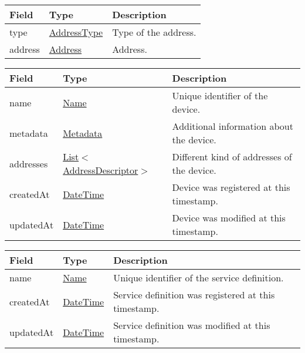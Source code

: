 \documentclass[a4paper]{arrowhead}
\newcommand{\pref}[1]{{\textcolor{ArrowheadGrey}{\hyperref[sec:model:primitives:#1]{#1}}}}
\begin{document}

\begin{table}[ht!]
\begin{tabularx}{\textwidth}{| p{2.5cm} | p{2.5cm} | X |} \hline
\rowcolor{gray!33} Field & Type      & Description \\ \hline
type & \pref{AddressType} & Type of the address. \\ \hline
address & \pref{Address} & Address. \\ \hline
\end{tabularx}
\end{table}

\clearpage

 
\begin{table}[ht!]
\begin{tabularx}{\textwidth}{| p{2.5cm} | p{4cm} | X |} \hline
\rowcolor{gray!33} Field & Type & Description \\ \hline
name & \pref{Name} & Unique identifier of the device. \\ \hline
metadata & \hyperref[sec:model:Metadata]{Metadata} & Additional information about the device. \\ \hline
addresses &  \pref{List}$<$\hyperref[sec:model:AddressDescriptor]{AddressDescriptor}$>$ & Different kind of addresses of the device.  \\ \hline
createdAt & \pref{DateTime} & Device was registered at this timestamp. \\ \hline
updatedAt & \pref{DateTime} & Device was modified at this timestamp. \\ \hline
\end{tabularx}
\end{table}

 
\begin{table}[ht!]
\begin{tabularx}{\textwidth}{| p{2.5cm} | p{2.5cm} | X |} \hline
\rowcolor{gray!33} Field & Type      & Description \\ \hline
name & \pref{Name} & Unique identifier of the service definition. \\ \hline
createdAt & \pref{DateTime} & Service definition was registered at this timestamp. \\ \hline
updatedAt & \pref{DateTime} & Service definition was modified at this timestamp. \\ \hline
\end{tabularx}
\end{table}
\end{document}
